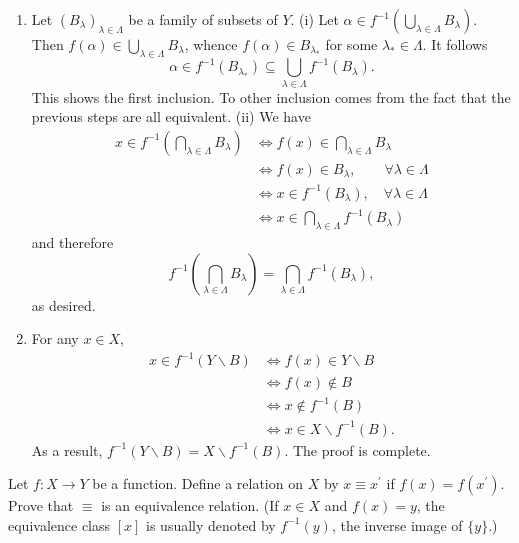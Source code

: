 \begin{questions}
\begin{theproof}
\begin{enumerate}[label=(\alph*)]
    \item  Let \((B_\lambda)_{\lambda\in \Lambda} \) be a family of subsets of \(Y\). 
    (i) Let \(\alpha\in f^{-1}\left(\bigcup_{\lambda\in\Lambda} B_{\lambda}\right)\).
    Then \(f(\alpha)\in \bigcup_{\lambda\in\Lambda} B_{\lambda}\), whence \(f(\alpha) \in B_{\lambda_*}\) for some \(\lambda_*\in \Lambda\).
    It follows 
    \[\alpha \in f^{-1} (B_{\lambda_*})\subseteq \bigcup_{\lambda\in\Lambda} f^{-1}\left(B_\lambda\right).\]
    This shows the first inclusion.
    To other inclusion comes from the fact that the previous steps are all equivalent.
    (ii) We have 
    \begin{align*}
        x \in f^{-1} \left(\bigcap\limits_{\lambda\in\Lambda} B_\lambda\right) & \iff f(x) \in \bigcap\limits_{\lambda\in\Lambda} B_\lambda \\
        & \iff f(x) \in B_\lambda, \qquad \forall \lambda \in \Lambda \\
        & \iff x \in f^{-1} (B_\lambda), \quad \forall \lambda \in \Lambda \\
        & \iff x \in \bigcap\limits_{\lambda\in\Lambda } f^{-1} (B_\lambda)
    \end{align*} and therefore
    \[
        f^{-1}\left(\bigcap_{\lambda\in\Lambda} B_\lambda\right)=\bigcap_{\lambda\in\Lambda} f^{-1}\left(B_{\lambda}\right),
    \]
    as desired.
        
    \item For any  \(x\in X\),
    \begin{align*}
        x \in f^{-1} (Y \backslash B) & \iff f(x) \in Y \backslash B \\
        & \iff f(x) \not \in B \\
        & \iff x \not \in f^{-1} (B) \\
        & \iff x \in X \backslash f^{-1} (B).
    \end{align*}
    As a result, \(f^{-1} (Y \backslash B) = X \backslash f^{-1} (B)\). The proof is complete.
        
\end{enumerate}    
\end{theproof}


\question
    Let \(f: X \rightarrow Y\) be a function. Define a relation on \(X\) by \(x \equiv x^{\prime}\) if \(f(x)=f\left(x^{\prime}\right)\). Prove that \(\equiv\) is an equivalence relation. (If \(x \in X\) and \(f(x)=y\), the equivalence class \([x]\) is usually denoted by \(f^{-1}(y)\), the inverse image of \(\{y\}\).)


\end{questions}
